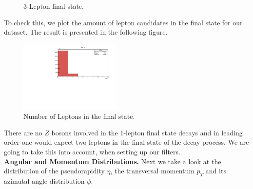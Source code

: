 \documentclass[twocolumn,
			   showpacs,%
               nofootinbib,
               aps,%
               prd,
               notitlepage,
               showkeys,
               10pt]{revtex4-1}
\begin{document}
\begin{figure}[H]
\centering	
{}
\caption{3-Lepton final state.}
\end{figure}

To check this, we plot the amount of lepton candidates in the final state for our dataset. The result is presented in the following figure.

\begin{figure}[H]
	\centering
	\includegraphics[width=0.45\textwidth]{figures/plots/lep_n_Muons}
	\caption{Number of Leptons in the final state.}
\end{figure}
There are no $Z$ bosons involved in the 1-lepton final state decays and in leading order one would expect two leptons in the final state of the decay process. We are going to take this into account, when setting up our filters.\\

\textbf{Angular and Momentum Distributions.}  
Next we take a look at the distribution of  the pseudorapidity $\eta$, the transversal momentum $p_T$ and its azimutal angle distribution $\phi$.
\end{document}
